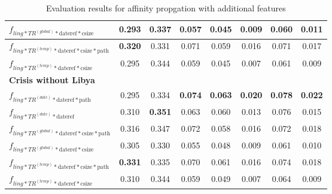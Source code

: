 \documentclass[a4paper,BCOR=10mm]{report}
\numberwithin{lemma}{chapter}
\numberwithin{definition}{chapter}
\begin{document}
\begin{table}
\begin{tabular}{|l|c|cc|cc|cc|}
$f_{ling*TR^{(global)}*\text{dateref}*\text{csize}}$     & 0.293    & 0.337 & 0.057 & 0.045 & 0.009 & 0.060 & 0.011 \\\hline
$f_{ling*TR^{(temp)}*\text{dateref}*\text{csize}*\text{path}}$   & \textbf{0.320}   & 0.331 & 0.071 & 0.059 & 0.016 & 0.071 & 0.017 \\\hline
$f_{ling*TR^{(temp)}*\text{dateref}*\text{csize}}$   & 0.295    & 0.344 & 0.059 & 0.045 & 0.007 & 0.061 & 0.009 \\\hline
\hline\multicolumn{8}{|l|}{ \textbf{Crisis without Libya}}\\\hline
$f_{ling*TR^{(date)}*\text{dateref}*\text{path}}$    & 0.295    & 0.334 & \textbf{0.074}    & \textbf{0.063}    & \textbf{0.020}    & \textbf{0.078}    & \textbf{0.022} \\\hline
$f_{ling*TR^{(date)}*\text{dateref}}$    & 0.310    & \textbf{0.351}    & 0.063 & 0.060 & 0.013 & 0.076 & 0.015 \\\hline
$f_{ling*TR^{(global)}*\text{dateref}*\text{csize}*\text{path}}$     & 0.316    & 0.347 & 0.072 & 0.058 & 0.016 & 0.072 & 0.018 \\\hline
$f_{ling*TR^{(global)}*\text{dateref}*\text{csize}}$     & 0.305    & 0.330 & 0.055 & 0.048 & 0.009 & 0.061 & 0.010 \\\hline
$f_{ling*TR^{(temp)}*\text{dateref}*\text{csize}*\text{path}}$   & \textbf{0.331}   & 0.335 & 0.070 & 0.061 & 0.016 & 0.074 & 0.018 \\\hline
$f_{ling*TR^{(temp)}*\text{dateref}*\text{csize}}$   & 0.310    & 0.344 & 0.059 & 0.049 & 0.007 & 0.064 & 0.009 \\\hline
\end{tabular}
\caption{Evaluation results for affinity propgation with additional features}
\label{tab:results-features}

\end{table}
\end{document}
